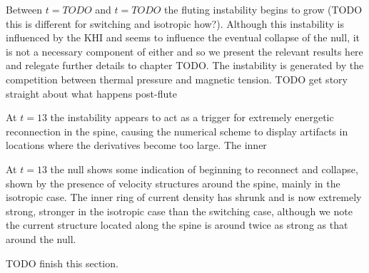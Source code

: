 Between $t=TODO$ and $t=TODO$ the fluting instability begins to grow (TODO this is different for switching and isotropic how?). Although this instability is influenced by the KHI and seems to influence the eventual collapse of the null, it is not a necessary component of either and so we present the relevant results here and relegate further details to chapter TODO. The instability is generated by the competition between thermal pressure and magnetic tension. 
TODO get story straight about what happens post-flute

At $t=13$ the instability appears to act as a trigger for extremely energetic reconnection in the spine, causing the numerical scheme to display artifacts in locations where the derivatives become too large. The inner

At $t=13$ the null shows some indication of beginning to reconnect and collapse, shown by the presence of velocity structures around the spine, mainly in the isotropic case. The inner ring of current density has shrunk and is now extremely strong, stronger in the isotropic case than the switching case, although we note the current structure located along the spine is around twice as strong as that around the null.

TODO finish this section.





